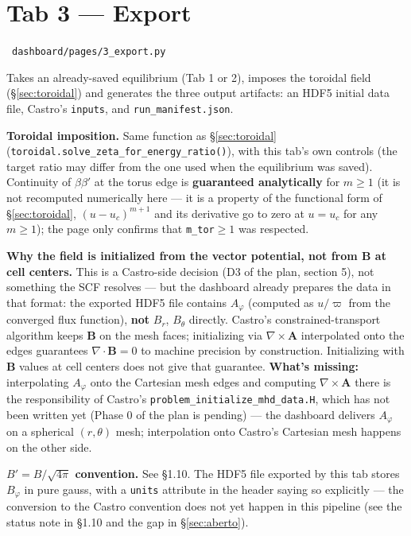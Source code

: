 \documentclass[11pt,a4paper]{scrartcl}
\newcommand{\arrowto}[1]{%
  \par\vspace{2pt}\noindent{\color{linkblue}$\rightarrow$}~\texttt{\small #1}\par\vspace{2pt}}
\newcommand{\code}[1]{\texttt{\small #1}}
\begin{document}
\section{Tab 3 --- Export}

\arrowto{dashboard/pages/3\_export.py}

Takes an already-saved equilibrium (Tab 1 or 2), imposes the toroidal
field (\S\ref{sec:toroidal}) and generates the three output artifacts:
an HDF5 initial data file, Castro's \code{inputs}, and
\code{run\_manifest.json}.

\textbf{Toroidal imposition.} Same function as \S\ref{sec:toroidal}
(\code{toroidal.solve\_zeta\_for\_energy\_ratio()}), with this tab's own
controls (the target ratio may differ from the one used when the
equilibrium was saved). Continuity of $\beta\beta'$ at the torus edge is
\textbf{guaranteed analytically} for $m\ge1$ (it is not recomputed
numerically here --- it is a property of the functional form of
\S\ref{sec:toroidal}, $(u-u_c)^{m+1}$ and its derivative go to zero at
$u=u_c$ for any $m\ge1$); the page only confirms that
\code{m\_tor}$\ge1$ was respected.

\textbf{Why the field is initialized from the vector potential, not from
B at cell centers.} This is a Castro-side decision (D3 of the plan,
section 5), not something the SCF resolves --- but the dashboard already
prepares the data in that format: the exported HDF5 file contains
$A_\varphi$ (computed as $u/\varpi$ from the converged flux function),
\textbf{not} $B_r$, $B_\theta$ directly. Castro's constrained-transport
algorithm keeps $\mathbf{B}$ on the mesh faces; initializing via
$\nabla\times\mathbf{A}$ interpolated onto the edges guarantees
$\nabla\cdot\mathbf{B}=0$ to machine precision by construction.
Initializing with $\mathbf{B}$ values at cell centers does not give that
guarantee. \textbf{What's missing:} interpolating $A_\varphi$ onto the
Cartesian mesh edges and computing $\nabla\times\mathbf{A}$ there is the
responsibility of Castro's \code{problem\_initialize\_mhd\_data.H}, which
has not been written yet (Phase 0 of the plan is pending) --- the
dashboard delivers $A_\varphi$ on a spherical $(r,\theta)$ mesh;
interpolation onto Castro's Cartesian mesh happens on the other side.

\textbf{$B'=B/\sqrt{4\pi}$ convention.} See \S1.10. The HDF5 file
exported by this tab stores $B_\varphi$ in pure gauss, with a
\code{units} attribute in the header saying so explicitly --- the
conversion to the Castro convention does not yet happen in this pipeline
(see the status note in \S1.10 and the gap in \S\ref{sec:aberto}).
\end{document}
